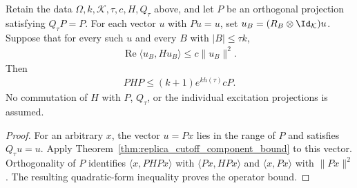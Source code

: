 \begin{theorem}
  \label{thm:replica_excitation_compression_bound}
  Retain the data $\Omega,k,\mathcal K,\tau,c,H,Q_\tau$ above, and let
  $P$ be an orthogonal projection satisfying $Q_\tau P=P$. For each
  vector $u$ with $Pu=u$, set $u_B=(R_B\otimes\Id_{\mathcal K})u$.
  Suppose that for every such $u$ and every $B$ with $|B|\le\tau k$,
  \begin{align}
    \operatorname{Re}\langle u_B,Hu_B\rangle\le c\|u_B\|^2.
  \end{align}
  Then
  \begin{align}
    PHP\le (k+1)e^{kh(\tau)}cP.
  \end{align}
  No commutation of $H$ with $P$, $Q_\tau$, or the individual excitation
  projections is assumed.
\end{theorem}
\begin{proof}
  For an arbitrary $x$, the vector $u=Px$ lies in the range of $P$ and
  satisfies $Q_\tau u=u$. Apply
  Theorem~\ref{thm:replica_cutoff_component_bound} to this vector.
  Orthogonality of $P$ identifies $\langle x,PHPx\rangle$ with
  $\langle Px,HPx\rangle$ and $\langle x,Px\rangle$ with $\|Px\|^2$.
  The resulting quadratic-form inequality proves the operator bound.
\end{proof}
